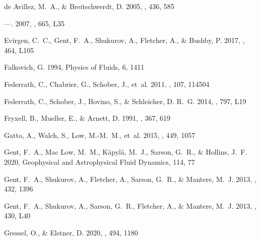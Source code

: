 \documentclass[preprint2]{aastex63}
\begin{document}
{\begin{thebibliography}{}
{de Avillez}, M.~A., \& {Breitschwerdt}, D. 2005, \aap, 436, 585

---. 2007, \apjl, 665, L35

{Evirgen}, C.~C., {Gent}, F.~A., {Shukurov}, A., {Fletcher}, A., \& {Bushby},
 P. 2017, \mnras, 464, L105

{Falkovich}, G. 1994, Physics of Fluids, 6, 1411

{Federrath}, C., {Chabrier}, G., {Schober}, J., {et~al.} 2011, \prl, 107,
 114504

{Federrath}, C., {Schober}, J., {Bovino}, S., \& {Schleicher}, D. R.~G. 2014,
 \apjl, 797, L19

{Fryxell}, B., {Mueller}, E., \& {Arnett}, D. 1991, \apj, 367, 619

{Gatto}, A., {Walch}, S., {Low}, M.-M.~M., {et~al.} 2015, \mnras, 449, 1057

{Gent}, F.~A., {Mac Low}, M.~M., {K{\"a}pyl{\"a}}, M.~J., {Sarson}, G.~R., \&
 {Hollins}, J.~F. 2020, Geophysical and Astrophysical Fluid Dynamics, 114, 77

{Gent}, F.~A., {Shukurov}, A., {Fletcher}, A., {Sarson}, G.~R., \& {Mantere},
 M.~J. 2013{}, \mnras, 432, 1396

{Gent}, F.~A., {Shukurov}, A., {Sarson}, G.~R., {Fletcher}, A., \& {Mantere},
 M.~J. 2013{}, \mnras, 430, L40

{Gressel}, O., \& {Elstner}, D. 2020, \mnras, 494, 1180


\end{thebibliography}}
\end{document}
